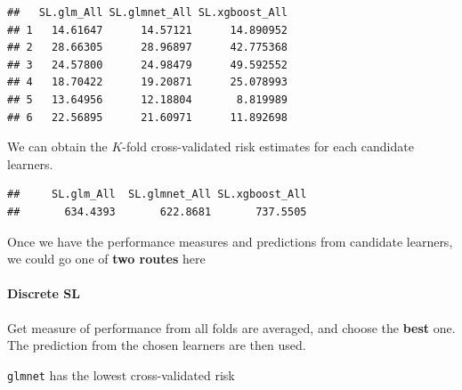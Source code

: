 \documentclass[
]{book}
\newenvironment{Shaded}{\begin{snugshade}}{\end{snugshade}}
\newcommand{\AttributeTok}[1]{\textcolor[rgb]{0.77,0.63,0.00}{#1}}
\newcommand{\FunctionTok}[1]{\textcolor[rgb]{0.00,0.00,0.00}{#1}}
\newcommand{\NormalTok}[1]{#1}
\newcommand{\OtherTok}[1]{\textcolor[rgb]{0.56,0.35,0.01}{#1}}
\newcommand{\SpecialCharTok}[1]{\textcolor[rgb]{0.00,0.00,0.00}{#1}}
\newcommand{\StringTok}[1]{\textcolor[rgb]{0.31,0.60,0.02}{#1}}
\begin{document}
\begin{Shaded}
\end{Shaded}

\begin{verbatim}
##   SL.glm_All SL.glmnet_All SL.xgboost_All
## 1   14.61647      14.57121      14.890952
## 2   28.66305      28.96897      42.775368
## 3   24.57800      24.98479      49.592552
## 4   18.70422      19.20871      25.078993
## 5   13.64956      12.18804       8.819989
## 6   22.56895      21.60971      11.892698
\end{verbatim}

We can obtain the \(K\)-fold cross-validated risk estimates for each candidate learners.

\begin{Shaded}
\end{Shaded}

\begin{verbatim}
##     SL.glm_All  SL.glmnet_All SL.xgboost_All 
##       634.4393       622.8681       737.5505
\end{verbatim}

Once we have the performance measures and predictions from candidate learners, we could go one of \textbf{two routes} here

\hypertarget{discrete-sl}{%
\paragraph{Discrete SL}\label{discrete-sl}}

\begin{rmdcomment}
Get measure of performance from all folds are averaged, and choose the
\textbf{best} one. The prediction from the chosen learners are then
used.
\end{rmdcomment}

\texttt{glmnet} has the lowest cross-validated risk

\begin{Shaded}
\end{Shaded}
\end{document}
